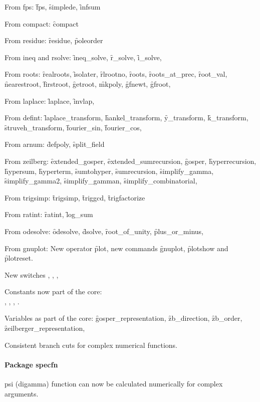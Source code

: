 From fps: \f{fps}, \f{simplede}, \f{infsum}

From compact: \f{compact}

From residue: \f{residue}, \f{poleorder}

From ineq and rsolve: \f{ineq\_solve}, \f{r\_solve}, \f{i\_solve},

From roots:
\f{realroots}, \f{isolater}, \f{rlrootno},
\f{roots}, \f{roots\_at\_prec}, \f{root\_val}, \f{nearestroot}, \f{firstroot},
\f{getroot}, \f{mkpoly}, \f{gfnewt}, \f{gfroot},

From laplace: \f{laplace}, \f{invlap},

From defint:
\f{laplace\_transform}, \f{hankel\_transform}, \f{y\_transform}, \f{k\_transform}, \f{struveh\_transform},
\f{fourier\_sin}, \f{fourier\_cos},

From arnum: \f{defpoly}, \f{split\_field}

From zeilberg:
\f{extended\_gosper}, \f{extended\_sumrecursion},
\f{gosper}, \f{hyperrecursion}, \f{hypersum}, \f{hyperterm},
\f{sumtohyper}, \f{sumrecursion},
\f{simplify\_gamma}, \f{simplify\_gamma2}, \f{simplify\_gamman}, \f{simplify\_combinatorial},

From trigsimp: \f{trigsimp}, \f{triggcd}, \f{trigfactorize}

From ratint: \f{ratint}, \f{log\_sum}

From odesolve:
\f{odesolve}, \f{dsolve}, \f{root\_of\_unity}, \f{plus\_or\_minus},

From gnuplot:
New operator \f{plot}, new commands \f{gnuplot}, \f{plotshow} and \f{plotreset}.

New switches , , , 

Constants now part of the core:\\
, , ,
.

Variables as part of the core: \f{gosper\_representation},
\f{zb\_direction}, \f{zb\_order}, \f{zeilberger\_representation},


Consistent branch cuts for complex numerical functions.



\paragraph{Package specfn}

psi (digamma) function can now be calculated numerically for complex arguments.

